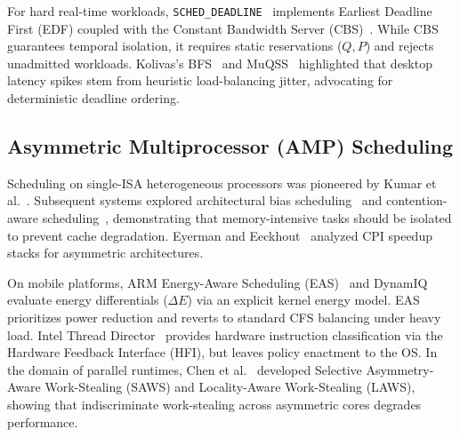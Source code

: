 \documentclass[conference]{IEEEtran}
\begin{document}
For hard real-time workloads, \texttt{SCHED\_DEADLINE}~\cite{lelli2016scheddeadline} implements Earliest Deadline First (EDF) coupled with the Constant Bandwidth Server (CBS)~\cite{abeni1998cbs,lipari2000cbs}. While CBS guarantees temporal isolation, it requires static reservations ($Q, P$) and rejects unadmitted workloads. Kolivas's BFS~\cite{kolivas2009bfs} and MuQSS~\cite{kolivas2016muqss} highlighted that desktop latency spikes stem from heuristic load-balancing jitter, advocating for deterministic deadline ordering.

\subsection{Asymmetric Multiprocessor (AMP) Scheduling}
Scheduling on single-ISA heterogeneous processors was pioneered by Kumar et al.~\cite{kumar2003singleisa,kumar2004singleisa}. Subsequent systems explored architectural bias scheduling~\cite{koufaty2010bias} and contention-aware scheduling~\cite{blagodurov2011numa,zhuravlev2010addressing,saez2012comprehensive}, demonstrating that memory-intensive tasks should be isolated to prevent cache degradation. Eyerman and Eeckhout~\cite{eyerman2014probabilistic,eyerman2008system} analyzed CPI speedup stacks for asymmetric architectures.

On mobile platforms, ARM Energy-Aware Scheduling (EAS)~\cite{rasmussen2018eas} and DynamIQ evaluate energy differentials ($\Delta E$) via an explicit kernel energy model. EAS prioritizes power reduction and reverts to standard CFS balancing under heavy load. Intel Thread Director~\cite{intel2021hfi,neri2022hfi} provides hardware instruction classification via the Hardware Feedback Interface (HFI), but leaves policy enactment to the OS. In the domain of parallel runtimes, Chen et al.~\cite{chen2016saws,chen2015laws} developed Selective Asymmetry-Aware Work-Stealing (SAWS) and Locality-Aware Work-Stealing (LAWS), showing that indiscriminate work-stealing across asymmetric cores degrades performance.
\end{document}
